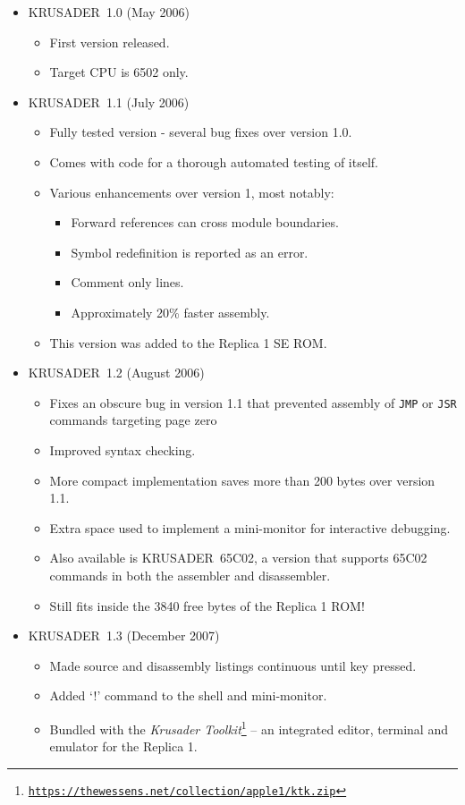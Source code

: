 \documentclass[12pt]{article}
\newcommand{\krusader}{\textsf{KRUSADER}}
\renewcommand{\url}[1]{\href{#1}{\texttt{#1}}}
\begin{document}
\begin{itemize}
	\item \krusader\ 1.0 (May 2006)
		\begin{itemize}
			\item First version released.
			\item Target CPU is 6502 only.
		\end{itemize}
	\item \krusader\ 1.1 (July 2006)
		\begin{itemize}
			\item Fully tested version - several bug fixes over version 1.0.
			\item Comes with code for a thorough automated testing of itself.
			\item Various enhancements over version 1, most notably:
			\begin{itemize}
				\item Forward references can cross module boundaries.
				\item Symbol redefinition is reported as an error.
				\item Comment only lines.
				\item Approximately 20\% faster assembly.
			\end{itemize}
			\item This version was added to the Replica 1 SE ROM.
		\end{itemize}
	\item \krusader\ 1.2 (August 2006)
		\begin{itemize}
			\item Fixes an obscure bug in version 1.1 that prevented assembly of \texttt{JMP}
				or \texttt{JSR} commands targeting page zero
			\item Improved syntax checking.
			\item More compact implementation saves more than 200 bytes over version 1.1.
			\item Extra space used to implement a mini-monitor for interactive debugging.
			\item Also available is \krusader\ 65C02, a version that supports 65C02 commands in both the assembler and disassembler.
			\item Still fits inside the 3840 free bytes of the Replica 1 ROM!
    \end{itemize}
	\item \krusader\ 1.3 (December 2007)
		\begin{itemize}
			\item Made source and disassembly listings continuous until key pressed.
			\item Added `!' command to the shell and mini-monitor.
			\item Bundled with the \textit{Krusader Toolkit}\footnote{\url{https://thewessens.net/collection/apple1/ktk.zip}} 
			-- an integrated editor, terminal and emulator for the Replica 1.
    \end{itemize}
  \end{itemize}
\end{document}
